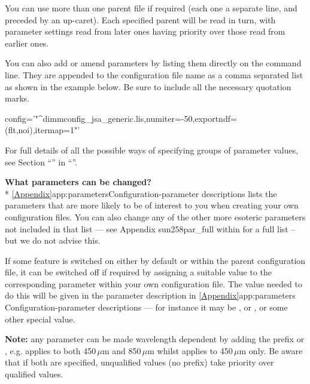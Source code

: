 You can use more than one parent file if required (each one a separate
line, and preceded by an up-caret). Each specified parent will be read in
turn, with parameter settings read from later ones having priority over
those read from earlier ones.

You can also add or amend parameters by listing them directly on the
command line. They are appended to the configuration file name as a
comma separated list as shown in the example below. Be sure to include
all the necessary quotation marks.

\begin{terminalv}
       config='"^dimmconfig_jsa_generic.lis,numiter=-50,exportndf=(flt,noi),itermap=1"'
\end{terminalv}

For full details of all the possible ways of specifying groups of
parameter values, see Section ``'' in ``''.

\textbf{What parameters can be changed?}\\*
\cref{Appendix}{app:parameters}{Configuration-parameter descriptions}
lists the parameters that are more likely to be of interest to you when
creating your own configuration files. You can also change any of the
other more esoteric parameters not included in that list --- see
Appendix  {sun258}{par_full} within  for a full list -- but we do not advise this.

\begin{tip}
  If some feature is switched on either by default or within
  the parent configuration file, it can be switched off if required
  by assigning a suitable value to the corresponding parameter within
  your own configuration file. The value needed to do this will be
  given in the parameter description in \cref{Appendix}{app:parameters}
  {Configuration-parameter descriptions} --- for instance it may be
  , or , or some other special value.
\end{tip}

\textbf{Note:} any parameter can be made wavelength dependent by
adding the prefix  or , e.g.
 applies to both 450\,$\mu$m and
850\,$\mu$m whilst  applies to
450\,$\mu$m only. Be aware that if both are specified, unqualified
values (no prefix) take priority over qualified values.

